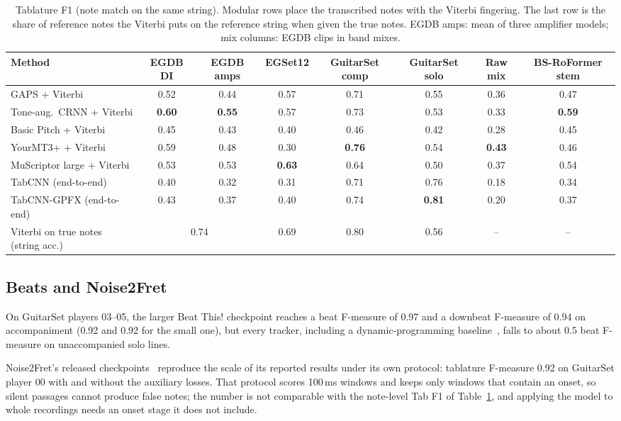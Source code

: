 \begin{table}[t]
\centering
\caption{Tablature F1 (note match on the same string). Modular rows place the
transcribed notes with the Viterbi fingering. The last row is the share of
reference notes the Viterbi puts on the reference string when given the true
notes. EGDB amps: mean of three amplifier models; mix columns: EGDB clips in
band mixes.}
\label{tab:bench-tab}
\footnotesize
\setlength{\tabcolsep}{4pt}
\begin{tabular}{@{}lccccccc@{}}
\toprule
Method & EGDB DI & EGDB amps & EGSet12 & GuitarSet comp & GuitarSet solo & Raw mix & BS-RoFormer stem \\
\midrule
GAPS + Viterbi & 0.52 & 0.44 & 0.57 & 0.71 & 0.55 & 0.36 & 0.47 \\
Tone-aug.\ CRNN + Viterbi & \textbf{0.60} & \textbf{0.55} & 0.57 & 0.73 & 0.53 & 0.33 & \textbf{0.59} \\
Basic Pitch + Viterbi & 0.45 & 0.43 & 0.40 & 0.46 & 0.42 & 0.28 & 0.45 \\
YourMT3+ + Viterbi & 0.59 & 0.48 & 0.30 & \textbf{0.76} & 0.54 & \textbf{0.43} & 0.46 \\
MuScriptor large + Viterbi & 0.53 & 0.53 & \textbf{0.63} & 0.64 & 0.50 & 0.37 & 0.54 \\
\midrule
TabCNN (end-to-end) & 0.40 & 0.32 & 0.31 & 0.71 & 0.76 & 0.18 & 0.34 \\
TabCNN-GPFX (end-to-end) & 0.43 & 0.37 & 0.40 & 0.74 & \textbf{0.81} & 0.20 & 0.37 \\
\midrule
Viterbi on true notes (string acc.) & \multicolumn{2}{c}{0.74} & 0.69 & 0.80 & 0.56 & -- & -- \\
\bottomrule
\end{tabular}
\end{table}

\subsection{Beats and Noise2Fret}
On GuitarSet players 03--05, the larger Beat This! checkpoint reaches a beat
F-measure of 0.97 and a downbeat F-measure of 0.94 on accompaniment
(0.92 and 0.92 for the small one), but every tracker, including a
dynamic-programming baseline~\cite{ellis2007beat}, falls to about 0.5 beat
F-measure on unaccompanied solo lines.

Noise2Fret's released checkpoints~\cite{simionato2026noise2fret} reproduce
the scale of its reported results under its own protocol: tablature F-measure
0.92 on GuitarSet player 00 with and without the auxiliary losses. That
protocol scores 100\,ms windows and keeps only windows that contain an onset,
so silent passages cannot produce false notes; the number is not comparable
with the note-level Tab F1 of Table~\ref{tab:bench-tab}, and applying the
model to whole recordings needs an onset stage it does not include.

